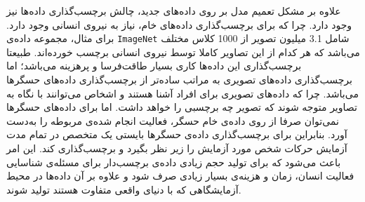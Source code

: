علاوه بر مشکل تعمیم مدل بر روی داده‌های جدید، چالش برچسب‌گذاری داده‌ها نیز وجود دارد. چرا که برای برچسب‌گذاری داده‌های خام، نیاز به نیروی انسانی وجود دارد. برای مثال، مجموعه داده‌ی
\verb|ImageNet|
شامل 3.1 میلیون تصویر از 1000 کلاس مختلف می‌باشد که هر کدام از این تصاویر کاملا توسط نیروی انسانی برچسب خورده‌اند\cite{deng2009imagenet}.
طبیعتا برچسب‌گذاری این داده‌ها کاری بسیار طاقت‌فرسا و پرهزینه می‌باشد؛ اما برچسب‌گذاری داده‌های تصویری به مراتب ساده‌تر از برچسب‌گذاری داده‌های حسگرها می‌باشد. چرا که داده‌های تصویری برای افراد آشنا هستند و اشخاص می‌توانند با نگاه به تصاویر متوجه شوند که تصویر چه برچسبی را خواهد داشت. اما برای داده‌های حسگرها نمی‌توان صرفا از روی داده‌ی خام حسگر، فعالیت انجام شده‌ی مربوطه را به‌دست آورد. بنابراین برای برچسب‌گذاری داده‌ی حسگرها بایستی یک متخصص در تمام مدت آزمایش حرکات شخص مورد آزمایش را زیر نظر بگیرد و برچسب‌گذاری کند. این امر باعث می‌شود که برای تولید حجم زیادی داده‌ی برچسب‌دار برای مسئله‌ی شناسایی فعالیت انسان، زمان و هزینه‌ی بسیار زیادی صرف شود و علاوه بر آن داده‌ها در محیط آزمایشگاهی که با دنیای واقعی متفاوت هستند تولید شوند.

